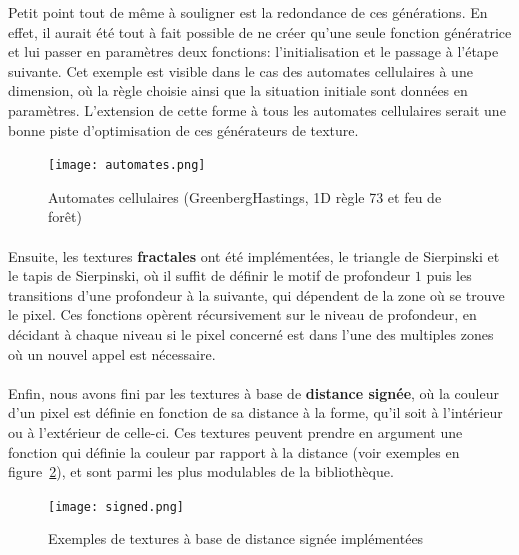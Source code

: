 \documentclass[a4paper]{article}
\begin{document}
Petit point tout de même à souligner est la redondance de ces générations. En effet, il aurait été tout à fait possible de ne créer qu'une seule fonction génératrice et lui passer en paramètres deux fonctions: l'initialisation et le passage à l'étape suivante. Cet exemple est visible dans le cas des automates cellulaires à une dimension, où la règle choisie ainsi que la situation initiale sont données en paramètres. L'extension de cette forme à tous les automates cellulaires serait une bonne piste d'optimisation de ces générateurs de texture.

\begin{figure}
    \centering
    \texttt{[image: automates.png]}
    \caption{Automates cellulaires (GreenbergHastings, 1D règle 73 et feu de forêt)}
    \label{fig:automates}
\end{figure}

\paragraph{}
Ensuite, les textures \textbf{fractales} ont été implémentées, le triangle de Sierpinski et le tapis de Sierpinski, où il suffit de définir le motif de profondeur $1$ puis les transitions d'une profondeur à la suivante, qui dépendent de la zone où se trouve le pixel. Ces fonctions opèrent récursivement sur le niveau de profondeur, en décidant à chaque niveau si le pixel concerné est dans l'une des multiples zones où un nouvel appel est nécessaire.

\paragraph{}
Enfin, nous avons fini par les textures à base de \textbf{distance signée}\cite{signedDistance}, où la couleur d'un pixel est définie en fonction de sa distance à la forme, qu'il soit à l'intérieur ou à l'extérieur de celle-ci. Ces textures peuvent prendre en argument une fonction qui définie la couleur par rapport à la distance (voir exemples en figure~\ref{fig:signed}), et sont parmi les plus modulables de la bibliothèque.

\begin{figure}
    \centering
    \texttt{[image: signed.png]}
    \caption{Exemples de textures à base de distance signée implémentées}
    \label{fig:signed}
\end{figure}
\end{document}
